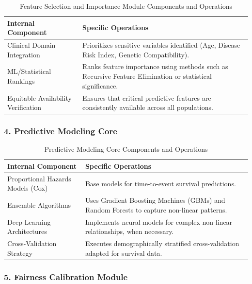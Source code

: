 \begin{table}[H]
\centering
\begin{tabular}{|p{5cm}|p{9cm}|}
\hline
\textbf{Internal Component} & \textbf{Specific Operations} \\
\hline
Clinical Domain Integration & Prioritizes sensitive variables identified (Age, Disease Risk Index, Genetic Compatibility). \\
\hline
ML/Statistical Rankings & Ranks feature importance using methods such as Recursive Feature Elimination or statistical significance. \\
\hline
Equitable Availability Verification & Ensures that critical predictive features are consistently available across all populations. \\
\hline
\end{tabular}
\caption{Feature Selection and Importance Module Components and Operations}
\label{tab:feature_module}
\end{table}

\subsubsection{4. Predictive Modeling Core}

\begin{table}[H]
\centering
\begin{tabular}{|p{5cm}|p{9cm}|}
\hline
\textbf{Internal Component} & \textbf{Specific Operations} \\
\hline
Proportional Hazards Models (Cox) & Base models for time-to-event survival predictions. \\
\hline
Ensemble Algorithms & Uses Gradient Boosting Machines (GBMs) and Random Forests to capture non-linear patterns. \\
\hline
Deep Learning Architectures & Implements neural models for complex non-linear relationships, when necessary. \\
\hline
Cross-Validation Strategy & Executes demographically stratified cross-validation adapted for survival data. \\
\hline
\end{tabular}
\caption{Predictive Modeling Core Components and Operations}
\label{tab:modeling_module}
\end{table}

\subsubsection{5. Fairness Calibration Module}


